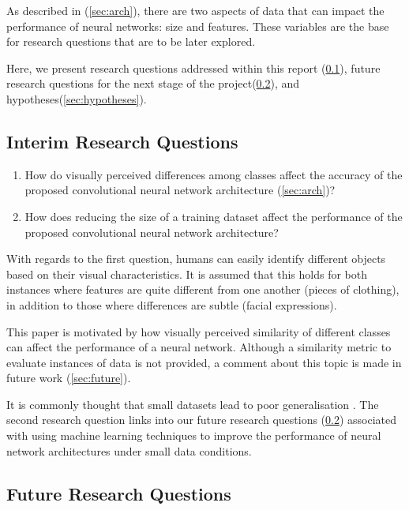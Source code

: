 \documentclass{article}
\begin{document}
As described in (\ref{sec:arch}), there are two aspects of data that can impact the performance of neural networks: size and features. These variables are the base for research questions that are to be later explored. 

Here, we present research questions addressed within this report (\ref{sec:irquestions}), future research questions for the next stage of the project(\ref{sec:frquestions}), and hypotheses(\ref{sec:hypotheses}).

\subsection{Interim Research Questions}
\label{sec:irquestions}

\begin{enumerate}
  \item How do visually perceived differences among classes affect the accuracy of the proposed convolutional neural network architecture (\ref{sec:arch})?
  \item How does reducing the size of a training dataset affect the performance of the proposed convolutional neural network architecture?
\end{enumerate}

With regards to the first question, humans can easily identify different objects based on their visual characteristics. It is assumed that this holds for both instances where features are quite different from one another (pieces of clothing), in addition to those where differences are subtle (facial expressions). 

This paper is motivated by how visually perceived similarity of different classes can affect the performance of a neural network. Although a similarity metric to evaluate instances of data is not provided, a comment about this topic is made in future work (\ref{sec:future}).

It is commonly thought that small datasets lead to poor generalisation \cite{lotsDataAndrew}. The second research question links into our future research questions (\ref{sec:frquestions}) associated with using machine learning techniques to improve the performance of neural network architectures under small data conditions.

\subsection{Future Research Questions}
\label{sec:frquestions}
\end{document}
